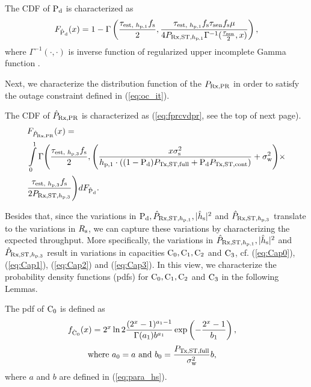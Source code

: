 \begin{lemma} \label{lm:lem1}
\normalfont
The CDF of $\text{P}_{\text{d}}$ is characterized as\cite{Kaushik16}
\begin{align}
F_{\hat{\text{P}}_{\text{d}}}(x) = 1 - \Gamma \left(\frac{\tau_{\text{est, $h_{\text{p,1}}$}} f_{\text{s}}}{2}, \frac{\tau_{\text{est, $h_{\text{p,1}}$}} f_{\text{s}} \tau_{\text{sen}} f_{\text{s}} \mu}{4 P_{\text{Rx,ST,$h_{\text{p,1}}$}} \Gamma^{-1}(\frac{\tau_{\text{sen}}}{2}, x) } \right), 
\label{eq:fpd}
\end{align}
where $\Gamma^{-1}(\cdot, \cdot)$ is inverse function of regularized upper incomplete Gamma function \cite{grad}.
\end{lemma}
Next, we characterize the distribution function of the $P_{\text{Rx,PR}}$ in order to satisfy the outage constraint defined in (\ref{eq:oc_it}). 
\begin{lemma} \label{lm:lem2}
\normalfont
The CDF of $\hat{P}_{\text{Rx,PR}}$ is characterized as (\ref{eq:fprcvdpr}, see the top of next page).
\begin{align}
&F_{\hat{P}_{\text{Rx,PR}}} (x) = \nonumber \\ 
&\int\limits_0^1 \Gamma \Bigg(\frac{\tau_{\text{est, $h_{\text{p,3}}$}} f_{\text{s}}}{2} , \Bigg( \frac{x \sigma^2_{\text{s}}}{h_{\text{p,1}} \cdot ((1 - \text{P}_{\text{d}}) P_{\text{Tx,ST,full}} + \text{P}_{\text{d}} P_{\text{Tx,ST,cont}})} + \sigma^2_{\text{w}}  \Bigg) \times \nonumber \\ 
&\frac{\tau_{\text{est, $h_{\text{p,3}}$}} f_{\text{s}}}{2 P_{\text{Rx,ST,$h_{\text{p,3}}$}}}  \Bigg) dF_{\hat{\text{P}}_{\text{d}}}. 
\label{eq:fprcvdpr}
\end{align}
\end{lemma}

Besides that, since the variations in $\text{P}_{\text{d}}, \hat{P}_{\text{Rx,ST,$h_{\text{p,1}}$}}, |\hat{h}_{\text{s}}|^2$ and $\hat{P}_{\text{Rx,ST,$h_{\text{p,3}}$}}$ translate to the variations in $R_{\text{s}}$, we can capture these variations by characterizing the expected throughput. More specifically, the variations in $\hat{P}_{\text{Rx,ST,$h_{\text{p,1}}$}}, |\hat{h}_{\text{s}}|^2$ and $\hat{P}_{\text{Rx,ST,$h_{\text{p,3}}$}}$ result in variations in capacities $\text{C}_{\text{0}}, \text{C}_{\text{1}}, \text{C}_{\text{2}}$ and $\text{C}_{\text{3}}$, cf. (\ref{eq:Cap0}), (\ref{eq:Cap1}), (\ref{eq:Cap2}) and (\ref{eq:Cap3}). In this view, we characterize the probability density functions (pdfs) for $\text{C}_{\text{0}}, \text{C}_{\text{1}}, \text{C}_{\text{2}}$ and $\text{C}_{\text{3}}$ in the following Lemmas.
\begin{lemma} \label{lm:lem3}
\normalfont
The pdf of $\text{C}_{\text{0}}$ is defined as \cite{Kaushik16}
\begin{align}
f_{\hat{\text{C}}_{\text{0}}}(x) &= 2^x \ln 2 \frac{(2^x - 1)^{a_1 - 1}}{\Gamma(a_1) b^{a_1}} \exp\left(-\frac{2^x - 1}{b_1}\right),  \label{eq:den_C0}
\end{align}
\vspace{-4mm}
\begin{align}
\text{where  } a_0 = a &\text{ and } b_0 = \frac{P_{\text{Tx,ST,full}}}{\sigma^2_{\text{w}}} b,  \label{eq:den_C0_para} 
\end{align}
where $a$ and $b$ are defined in (\ref{eq:para_hs}).
\end{lemma}

